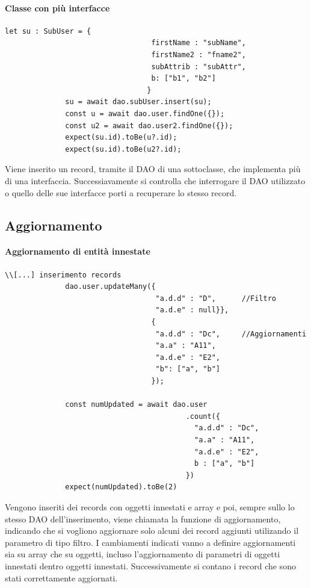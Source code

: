 \documentclass[a4paper, 12pt]{report}
\begin{document}
          \paragraph{Classe con più interfacce}
            \begin{Verbatim}[samepage=true]
              let su : SubUser = {
                                  firstName : "subName",
                                  firstName2 : "fname2",
                                  subAttrib : "subAttr",
                                  b: ["b1", "b2"]
                                 }
              su = await dao.subUser.insert(su);
              const u = await dao.user.findOne({});
              const u2 = await dao.user2.findOne({});
              expect(su.id).toBe(u?.id);
              expect(su.id).toBe(u2?.id);
            \end{Verbatim}
            Viene inserito un record, tramite il DAO di una sottoclasse, che implementa più di una interfaccia. Successiavamente si controlla che interrogare il DAO utilizzato o quello delle sue interfacce porti a recuperare lo stesso record.
          \newpage
        \subsection{Aggiornamento}
          \paragraph{Aggiornamento di entità innestate}
            \begin{Verbatim}[samepage=true]
              \\[...] inserimento records
              dao.user.updateMany({
                                   "a.d.d" : "D",      //Filtro
                                   "a.d.e" : null}},
                                  {
                                   "a.d.d" : "Dc",     //Aggiornamenti
                                   "a.a" : "A11",
                                   "a.d.e" : "E2",
                                   "b": ["a", "b"]
                                  });

              const numUpdated = await dao.user
                                          .count({
                                            "a.d.d" : "Dc",
                                            "a.a" : "A11",
                                            "a.d.e" : "E2",
                                            b : ["a", "b"]
                                          })
              expect(numUpdated).toBe(2)
            \end{Verbatim}
            Vengono inseriti dei records con oggetti innestati e array e poi, sempre sullo lo stesso DAO dell'inserimento, viene chiamata la funzione di aggiornamento, indicando che si vogliono aggiornare solo alcuni dei record aggiunti utilizando il parametro di tipo filtro.
            I cambiamenti indicati vanno a definire aggiornamenti sia su array che su oggetti, incluso l'aggiornamento di parametri di oggetti innestati dentro oggetti innestati.
            Successivamente si contano i record che sono stati correttamente aggiornati.
          \newpage
\end{document}
